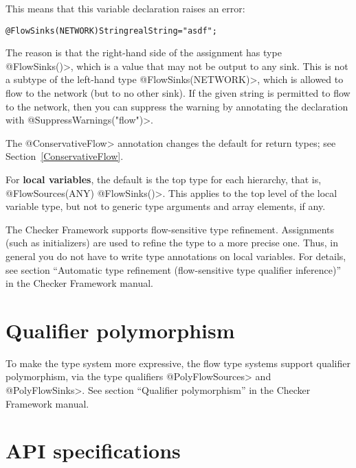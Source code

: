 This means that this variable declaration raises an error:

\begin{alltt}
@FlowSinks(NETWORK) String realString = "asdf";
\end{alltt}

The reason is that the right-hand side of the assignment has type
\<@FlowSinks({})>, which is a value that may not be output to any sink.
This is not a subtype of the left-hand type \<@FlowSinks(NETWORK)>, which
is allowed to flow to the network (but to no other sink).  If the given
string is permitted to flow to the network, then you can suppress the
warning by annotating the declaration with \<@SuppressWarnings("flow")>.

The \<@ConservativeFlow> annotation changes the default for return types;
see Section~\ref{ConservativeFlow}.

For \textbf{local variables}, the default is the top type for each
hierarchy, that is, \<@FlowSources(ANY) @FlowSinks({})>.  This applies to
the top level of the local variable type, but not to generic type arguments
and array elements, if any.

The Checker
Framework supports flow-sensitive type refinement.  Assignments (such as
initializers) are used to refine the type to a more precise one.  Thus, in
general you do not have to write type annotations on local variables.  For
details, see section ``Automatic type refinement (flow-sensitive type
qualifier inference)'' in the Checker Framework manual.


\section{Qualifier polymorphism}

To make the type system more expressive, the flow type systems support
qualifier polymorphism, via the type qualifiers \<@PolyFlowSources> and
\<@PolyFlowSinks>.
See section ``Qualifier polymorphism'' in the Checker Framework manual.



\section{API specifications}

